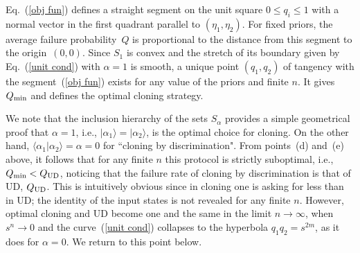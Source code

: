 \documentclass[aps,prl,twocolumn,showpacs]{revtex4}
\begin{document}
Eq.~(\ref{obj fun}) defines a straight segment on the unit square $0\le q_i\le 1$ with a normal vector in the first quadrant parallel to $(\eta_1,\eta_2)$. For fixed priors, the average failure probability~$Q$ is proportional to the distance from this segment to the origin~$(0,0)$. 
Since $S_1$ is convex and the stretch of its boundary given by Eq.~(\ref{unit cond}) with $\alpha=1$ is smooth, a unique point $(q_1,q_2)$ of tangency with the segment~(\ref{obj fun}) exists for any value of the priors and finite $n$.
It gives $Q_{\rm min}$ and defines the optimal cloning strategy. %

We note that the inclusion hierarchy of the sets $S_\alpha$ provides a simple geometrical proof that $\alpha=1$, i.e., $|\alpha_1\rangle=|\alpha_2\rangle$, is the optimal choice for cloning. On the other hand, $\langle\alpha_1|\alpha_2\rangle=\alpha=0$ for ``cloning by discrimination". From points~(d) and~(e) above, it follows that for any finite $n$ this protocol is strictly suboptimal, i.e., $Q_{\rm min}<Q_{\rm UD}$, noticing that the failure rate of cloning by discrimination is that of UD, $Q_{\rm UD}$. This is intuitively obvious since in cloning one is asking for less than in UD; the identity of the input states is not revealed for any finite $n$. However, optimal cloning and UD become one and the same in the limit $n \to \infty$, when $s^n \to 0$ and the curve~(\ref{unit cond}) collapses to the hyperbola $q_1 q_2=s^{2m}$, as it does for $\alpha=0$. We return to this point below.
\end{document}
